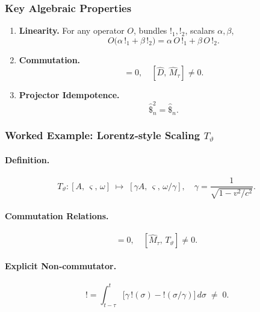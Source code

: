\subsubsection{Key Algebraic Properties}

\begin{enumerate}
  \item \textbf{Linearity.}  For any operator \(O\), bundles \(!_1, !_2\), scalars \(\alpha,\beta\),
    \begin{equation}
      O\bigl(\alpha\,!_1 + \beta\,!_2\bigr)
      = \alpha\,O\,!_1 + \beta\,O\,!_2.
    \end{equation}

  \item \textbf{Commutation.}
    \begin{equation}
      [\hat{\#}_\Delta,\,\hat{D}] = 0,
      \quad
      [\hat{D},\,\hat{M}_{\tau}] \neq 0.
    \end{equation}

  \item \textbf{Projector Idempotence.}
    \begin{equation}
      \hat{\$}_n^2 = \hat{\$}_n.
    \end{equation}
\end{enumerate}

\subsubsection{Worked Example: Lorentz‐style Scaling \(T_{\vartheta}\)}

\paragraph{Definition.}
\begin{equation}
  T_{\vartheta}:[A,\,\varsigma,\,\omega]
    \;\mapsto\;
  [\gamma A,\,\varsigma,\,\omega/\gamma],
  \quad
  \gamma = \frac{1}{\sqrt{1 - v^2/c^2}}.
\end{equation}

\paragraph{Commutation Relations.}
\begin{equation}
  [\hat{\#}_\Delta,\,T_{\vartheta}] = 0,
  \quad
  [\hat{M}_{\tau},\,T_{\vartheta}] \neq 0.
\end{equation}

\paragraph{Explicit Non‐commutator.}
\begin{equation}
  [\hat{M}_{\tau},\,T_{\vartheta}]\,!
  = \int_{t-\tau}^{t}
    \bigl[\gamma\,!(\sigma) - !(\sigma/\gamma)\bigr]\,d\sigma
  \;\neq\;0.
\end{equation}

